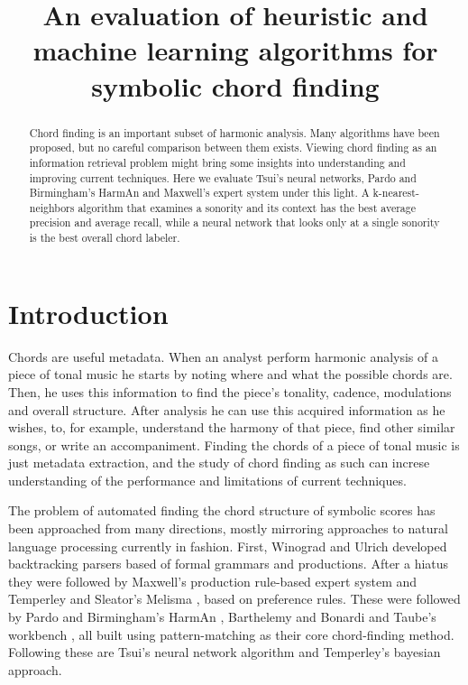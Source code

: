 \documentclass{article}
\title{An evaluation of heuristic and machine learning algorithms for
  symbolic chord finding} \oneauthor {}{}
\newcommand{\comment}[1]{}
\begin{document}
\graphicspath{{figs/}{data/}}
\maketitle

\begin{abstract}
  Chord finding is an important subset of harmonic analysis. Many
  algorithms have been proposed, but no careful comparison between
  them exists. Viewing chord finding as an information retrieval
  problem might bring some insights into understanding and improving
  current techniques. Here we evaluate Tsui's neural networks, Pardo
  and Birmingham's HarmAn and Maxwell's expert system under this
  light. A k-nearest-neighbors algorithm that examines a sonority and
  its context has the best average precision and average recall, while
  a neural network that looks only at a single sonority is the best
  overall chord labeler.
\end{abstract}

\section{Introduction}
\label{sec:introduction}

\comment{
  ==> chord finding é importante, vários algoritmos propostos, poucas
  comparações 
  ==> revisar algoritmos
  ==> descrever artigo
}

Chords are useful metadata. When an analyst perform harmonic analysis
of a piece of tonal music he starts by noting where and what the
possible chords are. Then, he uses this information to find the
piece's tonality, cadence, modulations and overall structure. After
analysis he can use this acquired information as he wishes, to, for
example, understand the harmony of that piece, find other similar
songs, or write an accompaniment. Finding the chords of a piece of
tonal music is just metadata extraction, and the study of chord
finding as such can increse understanding of the performance and
limitations of current techniques.

The problem of automated finding the chord structure of symbolic
scores has been approached from many directions, mostly mirroring
approaches to natural language processing currently in fashion.
First, Winograd \cite{winograd:linguistics} and Ulrich
\cite{ulrich:analysis} developed backtracking parsers based of formal
grammars and productions. After a hiatus they were followed by
Maxwell's \cite{maxwell:expert} production rule-based expert system
and Temperley and Sleator's Melisma \cite{temperley.ea:modeling},
based on preference rules. These were followed by Pardo and
Birmingham's HarmAn \cite{pardo.ea:automated}, Barthelemy and Bonardi
\cite{barthelemy.ea:figured} and Taube's workbench
\cite{taube:automatic}, all built using pattern-matching as their core
chord-finding method. Following these are Tsui's \cite{tsui:harmonic}
neural network algorithm and Temperley's \cite{temperley:bayesian}
bayesian approach.
\end{document}
